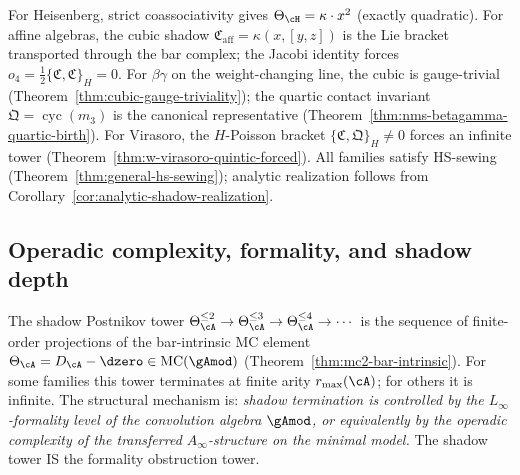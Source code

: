 \begin{example}
\noindent
For Heisenberg, strict coassociativity gives
$\Theta_{\cH} = \kappa \cdot x^2$ (exactly quadratic).
For affine algebras, the cubic shadow
$\mathfrak{C}_{\mathrm{aff}} = \kappa(x,[y,z])$ is the
Lie bracket transported through the bar complex;
the Jacobi identity forces
$o_4 = \tfrac12\{\mathfrak{C},\mathfrak{C}\}_H = 0$.
For $\beta\gamma$ on the weight-changing line, the cubic
is gauge-trivial
(Theorem~\ref{thm:cubic-gauge-triviality}); the
quartic contact invariant
$\mathfrak{Q} = \operatorname{cyc}(m_3)$ is the canonical
representative
(Theorem~\ref{thm:nms-betagamma-quartic-birth}).
For Virasoro, the $H$-Poisson bracket
$\{\mathfrak{C}, \mathfrak{Q}\}_H \neq 0$ forces an
infinite tower
(Theorem~\ref{thm:w-virasoro-quintic-forced}).
All families satisfy HS-sewing
(Theorem~\ref{thm:general-hs-sewing});
analytic realization follows from
Corollary~\ref{cor:analytic-shadow-realization}.
\end{example}




\subsection{Operadic complexity, formality, and shadow depth}
\label{subsec:operadic-complexity-shadow-depth}

The shadow Postnikov tower
$\Theta_\cA^{\leq 2} \to \Theta_\cA^{\leq 3} \to
\Theta_\cA^{\leq 4} \to \cdots$ is the sequence of
finite-order projections of the bar-intrinsic MC element
$\Theta_\cA = D_\cA - \dzero \in
\mathrm{MC}(\gAmod)$
(Theorem~\ref{thm:mc2-bar-intrinsic}).
For some families this tower terminates at finite arity
$r_{\max}(\cA)$; for others it is infinite.
The structural mechanism is:
\emph{shadow termination is controlled by the
$L_\infty$-formality level of the convolution algebra
$\gAmod$, or equivalently by the operadic complexity
of the transferred $A_\infty$-structure on the minimal
model.}  The shadow tower IS the formality obstruction
tower.

